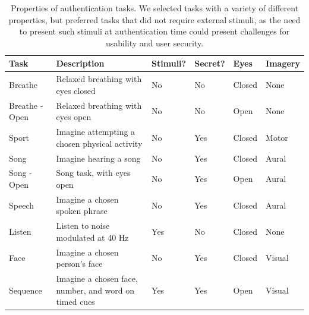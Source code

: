 \documentclass{sigchi}
\begin{document}
\begin{table}[t]
\centering
\begin{tabularx}{\textwidth}{llllll}

\textbf{Task} & \textbf{Description} & \textbf{Stimuli}? & \textbf{Secret}? & \textbf{Eyes} & \textbf{Imagery}\\
\hline
Breathe & Relaxed breathing with eyes closed & No & No & Closed & None\\
Breathe - Open & Relaxed breathing with eyes open & No & No & Open & None\\
Sport & Imagine attempting a chosen physical activity & No & Yes & Closed & Motor\\
Song & Imagine hearing a song & No & Yes & Closed & Aural\\
Song - Open & Song task, with eyes open & No & Yes & Open & Aural\\
Speech & Imagine a chosen spoken phrase & No & Yes & Closed & Aural\\
Listen & Listen to noise modulated at 40 Hz & Yes & No & Closed & None\\
Face & Imagine a chosen person's face & No & Yes & Closed & Visual\\
Sequence & Imagine a chosen face, number, and word on timed cues & Yes & Yes & Open & Visual\\
\hline
\end{tabularx}
\caption{Properties of authentication tasks. We selected tasks with a variety of different properties, but preferred tasks that did not require external stimuli, as the need to present such stimuli at authentication time could present challenges for usability and user security.}
\label{tab:tasks}%
\end{table}
\end{document}

